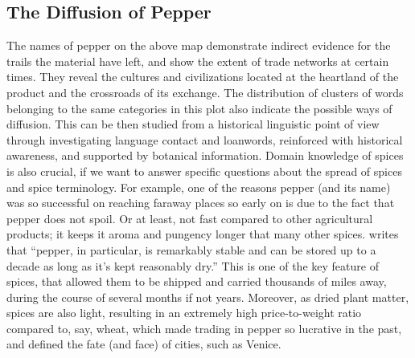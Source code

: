 






\subsection{The Diffusion of Pepper}

The names of pepper on the above map demonstrate indirect evidence for the trails the material have left, and show the extent of trade networks at certain times. They reveal the cultures and civilizations located at the heartland of the product and the crossroads of its exchange. The distribution of clusters of words belonging to the same categories in this plot also indicate the possible ways of diffusion. This can be then studied from a historical linguistic point of view through investigating language contact and loanwords, reinforced with historical awareness, and supported by botanical information. Domain knowledge of spices is also crucial, if we want to answer specific questions about the spread of spices and spice terminology. For example, one of the reasons pepper (and its name) was so successful on reaching faraway places so early on is due to the fact that pepper does not spoil. Or at least, not fast compared to other agricultural products; it keeps it aroma and pungency longer that many other spices. \textcite[59]{krondl_taste_2007} writes that ``pepper, in particular, is remarkably stable and can be stored up to a decade as long as it’s kept reasonably dry.'' This is one of the key feature of spices, that allowed them to be shipped and carried thousands of miles away, during the course of several months if not years. Moreover, as dried plant matter, spices are also light, resulting in an extremely high price-to-weight ratio compared to, say, wheat, which made trading in pepper so lucrative in the past, and defined the fate (and face) of cities, such as Venice.

